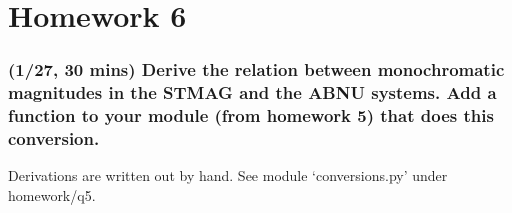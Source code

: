 \documentclass[12pt]{article}
\begin{document}
\section*{Homework 6}
\subsubsection{(1/27, 30 mins) Derive the relation between
monochromatic magnitudes in the STMAG and the ABNU systems. Add a
function to your module (from homework 5) that does this conversion.}

Derivations are written out by hand. See module `conversions.py' under
homework/q5.
\end{document}
